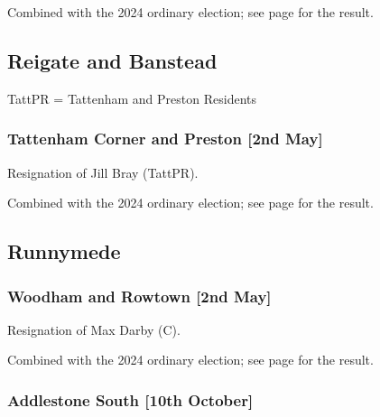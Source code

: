\documentclass[a4paper,openany]{book}
\begin{document}
\begin{resultsiii}
Combined with the 2024 ordinary election; see page \pageref{MoleValleyCapelLeighNewdigateCharlwood} for the result.

\subsection*{Reigate and Banstead}

TattPR = Tattenham and Preston Residents

\subsubsection*{Tattenham Corner and Preston \hspace*{\fill}\nolinebreak[1]%
	\enspace\hspace*{\fill}
	[2nd May]}


Resignation of Jill Bray (TattPR).

Combined with the 2024 ordinary election; see page \pageref{ReigateBansteadTattenhamCornerPreston} for the result.

\subsection*{Runnymede}

\subsubsection*{Woodham and Rowtown \hspace*{\fill}\nolinebreak[1]%
	\enspace\hspace*{\fill}
	[2nd May]}


Resignation of Max Darby (C).

Combined with the 2024 ordinary election; see page \pageref{RunnymedeWoodhamRowtown} for the result.

\subsubsection*{Addlestone South \hspace*{\fill}\nolinebreak[1]%
	\enspace\hspace*{\fill}
	[10th October]}


\end{resultsiii}
\end{document}
